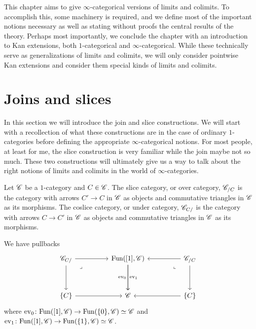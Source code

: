 \documentclass[../../thesis.tex]{subfiles}
\begin{document}
This chapter aims to give $\infty$-categorical versions of limits and colimits.
To accomplish this, some machinery is required, and we define most of the important notions necessary as well as stating without proofs the central results of the theory.
Perhaps most importantly, we conclude the chapter with an introduction to Kan extensions, both $1$-categorical and $\infty$-categorical.
While these technically serve as generalizations of limits and colimits, we will only consider pointwise Kan extensions and consider them special kinds of limits and colimits.
\section{Joins and slices}
In this section we will introduce the join and slice constructions.
We will start with a recollection of what these constructions are in the case of ordinary $1$-categories before defining the appropriate $\infty$-categorical notions.
For most people, at least for me, the slice construction is very familiar while the join maybe not so much.
These two constructions will ultimately give us a way to talk about the right notions of limits and colimits in the world of $\infty$-categories.
\begin{definition}\label{sliceobj}
    Let $\mathscr{C}$ be a $1$-category and $C\in \mathscr{C}$.
    The slice category, or over category, $\mathscr{C}_{/C}$ is the category with arrows $C'\to C$ in $\mathscr{C}$ as objects and commutative triangles in $\mathscr{C}$ as its morphisms.
    The coslice category, or under category, $\mathscr{C}_{C/}$ is the category with arrows $C\to C'$ in $\mathscr{C}$ as objects and commutative triangles in $\mathscr{C}$ as its morphisms.
\end{definition}
\begin{remark}
    We have pullbacks
    \[\begin{tikzcd}
            {\C_{C/}} && {\Fun([1],\C)} && {\C_{/C}} \\
            \\
            {\{C\}} && \C && {\{C\}}
            \arrow[from=3-1, to=3-3]
            \arrow[from=1-1, to=3-1]
            \arrow[from=1-1, to=1-3]
            \arrow["{\mathrm{ev}_0}"', from=1-3, to=3-3]
            \arrow[from=1-5, to=1-3]
            \arrow[from=1-5, to=3-5]
            \arrow[from=3-5, to=3-3]
            \arrow["{\mathrm{ev}_1}", from=1-3, to=3-3]
            \arrow["\lrcorner"{anchor=center, pos=0.125, rotate=-90}, draw=none, from=1-5, to=3-3]
            \arrow["\lrcorner"{anchor=center, pos=0.125}, draw=none, from=1-1, to=3-3]
        \end{tikzcd}\]
    where $\mathrm{ev}_0 \colon \mathrm{Fun}([1],\mathscr{C}) \to \mathrm{Fun}(\{0\}, \mathscr{C}) \simeq \mathscr{C}$ and $\mathrm{ev}_1 \colon \mathrm{Fun}([1],\mathscr{C}) \to \mathrm{Fun}(\{1\}, \mathscr{C}) \simeq \mathscr{C}$.
\end{remark}
\end{document}
